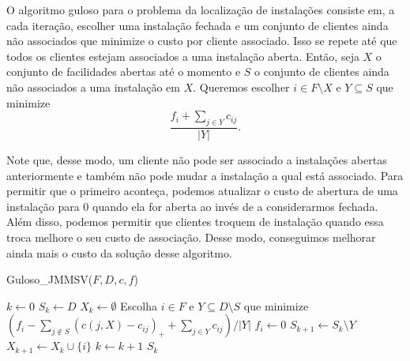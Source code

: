 O algoritmo guloso para o problema da localização de instalações consiste em, a cada iteração, escolher uma instalação fechada e um conjunto de clientes ainda não associados que minimize o custo por cliente associado. 
Isso se repete até que todos os clientes estejam associados a uma instalação aberta. Então, seja $X$ o conjunto de facilidades abertas até o momento e $S$ o conjunto de clientes ainda não associados a uma instalação em $X$. Queremos escolher $i \in F \setminus X$ e $Y \subseteq S$ que minimize
\[ \frac{f_i + \sum_{j \in Y} c_{ij}}{|Y|}.
    \] 

Note que, desse modo, um cliente não pode ser associado a instalações abertas anteriormente e também não pode mudar a instalação a qual está associado. 
Para permitir que o primeiro aconteça, podemos atualizar o custo de abertura de uma instalação para 0 quando ela for aberta ao invés de a considerarmos fechada. Além disso, podemos permitir que clientes troquem de instalação quando essa troca melhore o seu custo de associação. Desse modo, conseguimos melhorar ainda mais o custo da solução desse algoritmo.
\begin{algorithm}
    \caption{Guloso\_JMMSV($F,D,c,f$)}
    \begin{algorithmic}[1]
        \State $k \gets 0$
        \State $S_k \gets D$
        \State $X_k \gets \emptyset$
        \State Escolha $i \in F$ e $Y \subseteq D\setminus S$ que minimize $(f_i - \sum_{j \not \in S}(c(j,X) - c_{ij})_+ + \sum_{j \in Y}c_{ij})/|Y|$
        \State $f_i \gets 0$
        \State $S_{k+1} \gets S_k \setminus Y$
        \State $X_{k+1} \gets X_k \cup \{i\}$
        \State $k \gets k+1$
        \EndWhile
        \State \Return $S_k$
    \end{algorithmic}
\end{algorithm}